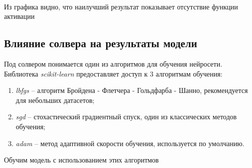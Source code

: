 \documentclass[11pt]{article}
\begin{document}
    \begin{center}
    \end{center}
    { \hspace*{\fill} \\}
    
    Из графика видно, что наилучший результат показывает отсутствие функции
активации

    \hypertarget{ux432ux43bux438ux44fux43dux438ux435-ux441ux43eux43bux432ux435ux440ux430-ux43dux430-ux440ux435ux437ux443ux43bux44cux442ux430ux442ux44b-ux43cux43eux434ux435ux43bux438}{%
\subsection{Влияние солвера на результаты
модели}\label{ux432ux43bux438ux44fux43dux438ux435-ux441ux43eux43bux432ux435ux440ux430-ux43dux430-ux440ux435ux437ux443ux43bux44cux442ux430ux442ux44b-ux43cux43eux434ux435ux43bux438}}

Под солвером понимается один из алгоритмов для обучения нейросети.
Библиотека \textit{scikit-learn} предоставляет доступ к 3 алгоритмам
обучения:

\begin{enumerate}
    \item \textit{lbfgs} -- алгоритм Бройдена - Флетчера - Гольдфарба - Шанно, рекомендуется для небольших датасетов;
    \item \textit{sgd} -- стохастический градиентный спуск, один из классических методов обучения; 
    \item \textit{adam} -- метод адаптивной скорости обучения, используется по умолчанию.
\end{enumerate}

Обучим модель с использованием этих алгоритмов
\end{document}

